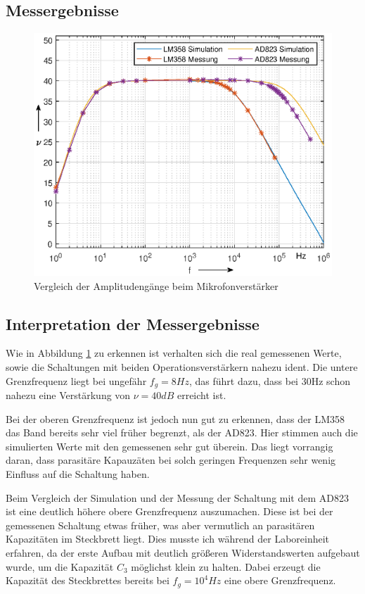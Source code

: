 \subsection{Messergebnisse}
\begin{figure}[H]
    \centering
    \includegraphics[width=\costumPicWidth]{Lab_3/Plots/Mikrofonverstaerker.eps}
    \caption{Vergleich der Amplitudengänge beim Mikrofonverstärker}
    \label{fig:Amplitudengang_Mikverstaerker}
\end{figure}
\subsection{Interpretation der Messergebnisse} 
Wie in Abbildung \ref{fig:Amplitudengang_Mikverstaerker} zu erkennen ist verhalten sich die real gemessenen Werte, sowie die Schaltungen mit beiden Operationsverstärkern nahezu ident. Die untere Grenzfrequenz liegt bei ungefähr $f_g=8Hz$, das führt dazu, dass bei 30Hz schon nahezu eine Verstärkung von $\nu = 40dB$ erreicht ist.

Bei der oberen Grenzfrequenz ist jedoch nun gut zu erkennen, dass der LM358 das Band bereits sehr viel früher begrenzt, als der AD823. Hier stimmen auch die simulierten Werte mit den gemessenen sehr gut überein. Das liegt vorrangig daran, dass parasitäre Kapauzäten bei solch geringen Frequenzen sehr wenig Einfluss auf die Schaltung haben.

Beim Vergleich der Simulation und der Messung der Schaltung mit dem AD823 ist eine deutlich höhere obere Grenzfrequenz auszumachen. Diese ist bei der gemessenen Schaltung etwas früher, was aber vermutlich an parasitären Kapazitäten im Steckbrett liegt. Dies musste ich während der Laboreinheit erfahren, da der erste Aufbau mit deutlich größeren Widerstandswerten aufgebaut wurde, um die Kapazität $C_3$ möglichst klein zu halten. Dabei erzeugt die Kapazität des Steckbrettes bereits bei $f_g=10^4Hz$ eine obere Grenzfrequenz. 

